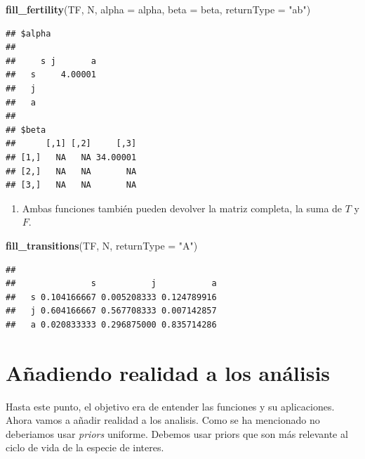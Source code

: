 \documentclass[
]{book}
\newenvironment{Shaded}{\begin{snugshade}}{\end{snugshade}}
\newcommand{\AttributeTok}[1]{\textcolor[rgb]{0.13,0.29,0.53}{#1}}
\newcommand{\FunctionTok}[1]{\textcolor[rgb]{0.13,0.29,0.53}{\textbf{#1}}}
\newcommand{\NormalTok}[1]{#1}
\newcommand{\StringTok}[1]{\textcolor[rgb]{0.31,0.60,0.02}{#1}}
\providecommand{\tightlist}{%
  \setlength{\itemsep}{0pt}\setlength{\parskip}{0pt}}
\theoremstyle{definition}
\theoremstyle{definition}
\theoremstyle{definition}
\theoremstyle{definition}
\theoremstyle{remark}
\begin{document}
\begin{Shaded}
\begin{Highlighting}[]
\FunctionTok{fill\_fertility}\NormalTok{(TF, N, }
               \AttributeTok{alpha =}\NormalTok{ alpha,}
               \AttributeTok{beta =}\NormalTok{ beta,}
               \AttributeTok{returnType =} \StringTok{"ab"}\NormalTok{)}
\end{Highlighting}
\end{Shaded}

\begin{verbatim}
## $alpha
##    
##     s j       a
##   s     4.00001
##   j            
##   a            
## 
## $beta
##      [,1] [,2]     [,3]
## [1,]   NA   NA 34.00001
## [2,]   NA   NA       NA
## [3,]   NA   NA       NA
\end{verbatim}

\begin{enumerate}
\def\labelenumi{\arabic{enumi}.}
\setcounter{enumi}{2}
\tightlist
\item
  Ambas funciones también pueden devolver la matriz completa, la suma
  de \(T\) y \(F\).
\end{enumerate}

\begin{Shaded}
\begin{Highlighting}[]
\FunctionTok{fill\_transitions}\NormalTok{(TF, N, }\AttributeTok{returnType =} \StringTok{"A"}\NormalTok{)}
\end{Highlighting}
\end{Shaded}

\begin{verbatim}
##    
##               s           j           a
##   s 0.104166667 0.005208333 0.124789916
##   j 0.604166667 0.567708333 0.007142857
##   a 0.020833333 0.296875000 0.835714286
\end{verbatim}

\hypertarget{auxf1adiendo-realidad-a-los-anuxe1lisis}{%
\section{Añadiendo realidad a los análisis}\label{auxf1adiendo-realidad-a-los-anuxe1lisis}}

Hasta este punto, el objetivo era de entender las funciones y su
aplicaciones. Ahora vamos a añadir realidad a los analisis. Como se ha
mencionado no deberiamos usar \emph{priors} uniforme. Debemos usar priors que
son más relevante al ciclo de vida de la especie de interes.
\end{document}
